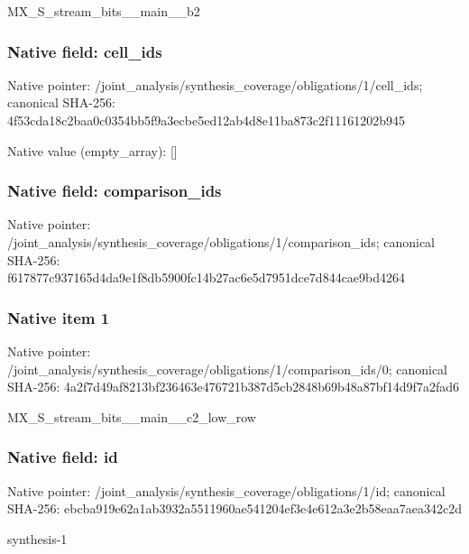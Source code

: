\documentclass[10pt,a4paper]{article}
\begin{document}
\begingroup\raggedright\sloppy MX\_\allowbreak{}S\_\allowbreak{}stream\_\allowbreak{}bits\_\allowbreak{}\_\allowbreak{}main\_\allowbreak{}\_\allowbreak{}b2\par\endgroup

\subsubsection{Native field: cell\_\allowbreak{}ids}
Native pointer: /joint\_\allowbreak{}analysis/synthesis\_\allowbreak{}coverage/obligations/1/cell\_\allowbreak{}ids; canonical SHA-256: 4f53cda18c2baa0c0354bb5f9a3ecbe5ed12ab4d8e11ba873c2f11161202b945

Native value (empty\_\allowbreak{}array): []

\subsubsection{Native field: comparison\_\allowbreak{}ids}
Native pointer: /joint\_\allowbreak{}analysis/synthesis\_\allowbreak{}coverage/obligations/1/comparison\_\allowbreak{}ids; canonical SHA-256: f617877c937165d4da9e1f8db5900fc14b27ac6e5d7951dce7d844cae9bd4264

\subsubsection{Native item 1}
Native pointer: /joint\_\allowbreak{}analysis/synthesis\_\allowbreak{}coverage/obligations/1/comparison\_\allowbreak{}ids/0; canonical SHA-256: 4a2f7d49af8213bf236463e476721b387d5cb2848b69b48a87bf14d9f7a2fad6

\begingroup\raggedright\sloppy MX\_\allowbreak{}S\_\allowbreak{}stream\_\allowbreak{}bits\_\allowbreak{}\_\allowbreak{}main\_\allowbreak{}\_\allowbreak{}c2\_\allowbreak{}low\_\allowbreak{}row\par\endgroup

\subsubsection{Native field: id}
Native pointer: /joint\_\allowbreak{}analysis/synthesis\_\allowbreak{}coverage/obligations/1/id; canonical SHA-256: ebcba919e62a1ab3932a5511960ae541204ef3e4e612a3e2b58eaa7aea342c2d

\begingroup\raggedright\sloppy synthesis-1\par\endgroup
\end{document}
